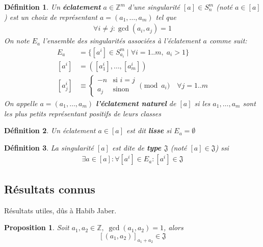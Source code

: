 \documentclass{article}
\newtheorem{definition}{Définition}
\newtheorem{proposition}{Proposition}
\begin{document}
\begin{definition}
    Un \textbf{éclatement} $a \in \mathbb{Z}^m$ d'une singularité $[a] \in S_n^m$ (noté $a \in [a]$) est un choix de 
    représentant $a = (a_1, \dots, a_m)$ tel que
    \begin{align*}
        \forall i \neq j : \gcd(a_i, a_j) = 1
    \end{align*}
    On note $E_a$ l'ensemble des singularités associées à l'éclatement $a$ comme suit:
    \begin{align*}
        E_a & = \{ [a^i] \in S_{a_i}^m \mid \forall i = 1..m,\; a_i > 1 \} \\
        [a^i] & = ([a^i_1], \dots, [a^i_m]) \\
        [a^i_j] & \equiv \begin{cases}
            -n & \text{si $i = j$} \\
            a_j & \text{sinon}
        \end{cases} \pmod{a_i} \quad \forall j = 1..m
    \end{align*}
    On appelle $a = (a_1, \dots, a_m)$ \textbf{l'éclatement naturel} de $[a]$ si 
    les $a_1, \dots, a_m$ sont les plus petits représentant positifs de leurs classes
\end{definition}

\begin{definition}
    Un éclatement $a \in [a]$ est dit \textbf{lisse} si $E_a = \emptyset$
\end{definition}

\begin{definition}
    La singularité $[a]$ est dite de \textbf{type $\mathfrak{J}$} (noté $[a] \in \mathfrak{J}$) ssi
    \begin{align*}
        \exists a \in [a] : \forall [a^i] \in E_a : [a^i] \in \mathfrak{J}
    \end{align*}
\end{definition}

\newpage

\subsection{Résultats connus}
Résultats utiles, dûs à Habib Jaber.

\begin{proposition}
    Soit $a_1, a_2 \in \mathbb{Z},\; \gcd(a_1, a_2) = 1$, alors
    \[ {[(a_1, a_2)]}_{a_1+a_2} \in \mathfrak{J} \]
\end{proposition}
\end{document}

